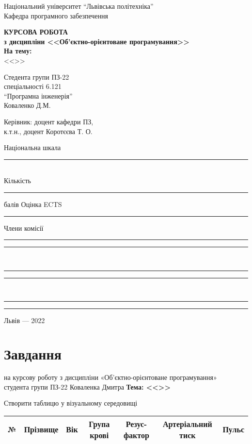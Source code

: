 \documentclass[oneside,14pt]{extarticle}
\begin{document}
\begin{titlepage}
	\begin{center}
		Національний університет “Львівська політехніка”\\
		Кафедра програмного забезпечення
		
		\vspace{170pt}
		\textbf{КУРСОВА РОБОТА}\\
		\textbf{з дисципліни <<Об’єктно-орієнтоване програмування>>}\\
		\textbf{На тему:}\\
		<<>>
		\vspace*{40pt}
		
		\begin{flushright}
			Стедента групи ПЗ-22\\
			спеціальності 6.121\\
			“Програмна інженерія”\\
			Коваленко Д.М.
			\bigbreak
			
			Керівник: доцент кафедри ПЗ,\\
			к.т.н., доцент Коротєєва Т. О.
			\bigbreak
			
			Національна шкала \rule{4cm}{0.15mm}\\			
			Кількість \rule{1cm}{0.15mm} балів  Оцінка ECTS \rule{1cm}{0.15mm}
			\bigbreak
			
			Члени комісії \rule{1cm}{0.15mm} \rule{4cm}{0.15mm}\\
			\rule{1cm}{0.15mm} \rule{4cm}{0.15mm}\\
			\rule{1cm}{0.15mm} \rule{4cm}{0.15mm}
		\end{flushright}
		\vspace{\fill}
		Львів — 2022
	\end{center}
\end{titlepage}
\setcounter{page}{2}
\tableofcontents
\newpage
\section*{Завдання}
\begin{center}
	на курсову роботу з дисципліни «Об’єктно-орієнтоване програмування»\\
	студента групи ПЗ-22 Коваленка Дмитра
	\bigbreak
	\textbf{Тема: <<>>}
\end{center}
Створити таблицю у візуальному середовищі

\begin{tabular}{|c|c|c|c|c|c|c|}
	\hline
	№ & Прізвище & Вік & Група крові & Резус-фактор & Артеріальний тиск & Пульс\\
	\hline
\end{tabular}
\end{document}
